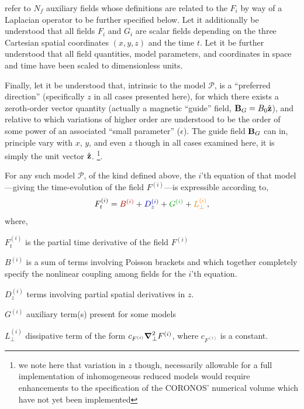 \documentclass[12pt]{memoir}
\newcommand{\coronos}{\textsf{CORONOS}}
\newcommand{\pmodel}{\mathscr{P}}
\begin{document}
refer to $N_f$ auxiliary fields whose definitions are related to the $F_i$ by
way of a Laplacian operator to be further specified below. Let it additionally
be understood that all fields $F_i$ and $G_i$ are scalar fields depending on
the three Cartesian spatial coordinates $(x,y,z)$ and the time $t$. Let it be
further understood that all field quantities, model parameters, and coordinates
in space and time have been scaled to dimensionless units. 
%
\par
%
Finally, let it be understood that, intrinsic to the model $\pmodel$, is a
``preferred direction'' (specifically $z$ in all cases presented here),
for which there exists a zeroth-order vector quantity (actually a magnetic
``guide'' field, $\mathbf{B}_G=B_0\hat{\mathbf{z}}$), and relative to which variations of
higher order are understood to be the order of some power of an associated
``small parameter'' ($\epsilon$). The guide field $\mathbf{B}_G$ can in, principle
vary with $x$, $y$, and even $z$ though in all cases examined here,
it is simply the unit vector $\hat{\mathbf{z}}$. \footnote{we note here that variation
in $z$ though, necessarily allowable for a full implementation of inhomogeneous
reduced models would require enhancements to the specification of the \coronos'
numerical volume which have not yet been implemented}.
%
\par
%
For any such model $\pmodel$, of the kind defined above, the $i$'th equation of
that model---giving the time-evolution of the field $F^{(i)}$---is expressible
according to,
%
\begin{equation}
  F^{(i)}_t = { \color{red!65!black} B^{(i)}}
            + { \color{blue!65!black} D^{(i)}_z}
            + { \color{green!65!black}G^{(i)}}
            + { \color{orange} L^{(i)}_\perp},
            \label{eq:redmodabs}
\end{equation}
%
where,
%
\begin{list}{\Box}{
  \setlength{\labelwidth}{5cm}
  \setlength{\leftmargin}{2.25cm}
                  }
%
   \item[$F^{(i)}_t$]{is the partial time derivative of the field $F^{(i)}$}
%
   \item[{\color{red!65!black}$B^{(i)}$}]{is a sum of terms involving Poisson
          brackets and which together completely specify the nonlinear coupling
          among fields for the $i$'th equation.}
%
   \item[{\color{blue!65!black}$D_z^{(i)}$}]{terms involving partial spatial 
         derivatives in $z$.}
%
   \item[{\color{green!65!black}$G^{(i)}$}]{auxiliary term(s) present for some 
         models}
%
   \item[{\color{orange}$L^{(i)}_\perp$}]{dissipative term of the form 
         $c_{F^{(i)}}\boldsymbol{\nabla}_\perp^2F^{(i)}$, where $c_{F^{(i)}}$ is a constant.}
%
\end{list}
\end{document}

